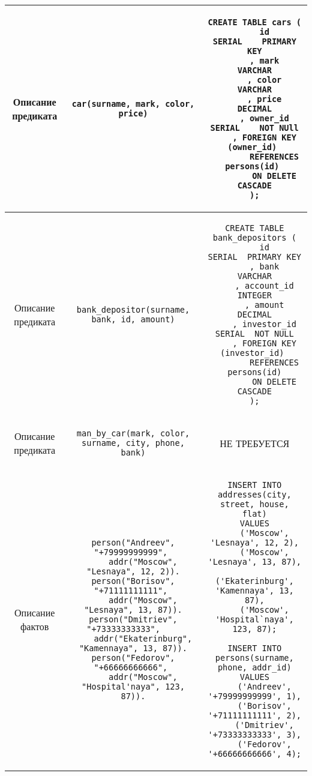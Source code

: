 \begin{landscape}
\begin{longtable}{|c|c|c|}
\hline

Описание предиката&
\begin{lstlisting}
car(surname, mark, color, price)
\end{lstlisting}&
\begin{lstlisting}
CREATE TABLE cars (
    id          SERIAL    PRIMARY KEY
    , mark      VARCHAR
    , color     VARCHAR
    , price     DECIMAL
    , owner_id  SERIAL    NOT NUll
    , FOREIGN KEY (owner_id) 
        REFERENCES persons(id) 
        ON DELETE CASCADE
);
\end{lstlisting} \\

\hline

Описание предиката&
\begin{lstlisting}
bank_depositor(surname, bank, id, amount)
\end{lstlisting}&
\begin{lstlisting}
CREATE TABLE bank_depositors (
    id            SERIAL  PRIMARY KEY
    , bank        VARCHAR
    , account_id  INTEGER
    , amount      DECIMAL
    , investor_id SERIAL  NOT NULL
    , FOREIGN KEY (investor_id) 
        REFERENCES persons(id)
        ON DELETE CASCADE
);
\end{lstlisting} \\

\hline

Описание предиката&
\begin{lstlisting}
man_by_car(mark, color, surname, city, phone, bank)
\end{lstlisting}&
НЕ ТРЕБУЕТСЯ\\

\hline

Описание фактов&
\begin{lstlisting}
person("Andreev", "+79999999999", 
    addr("Moscow", "Lesnaya", 12, 2)).
person("Borisov", "+71111111111", 
    addr("Moscow", "Lesnaya", 13, 87)).
person("Dmitriev", "+73333333333",    
    addr("Ekaterinburg", "Kamennaya", 13, 87)).
person("Fedorov", "+66666666666", 
    addr("Moscow", "Hospital'naya", 123, 87)).
\end{lstlisting}&
\begin{lstlisting}
INSERT INTO addresses(city, street, house, flat)
VALUES
    ('Moscow', 'Lesnaya', 12, 2),
    ('Moscow', 'Lesnaya', 13, 87),
    ('Ekaterinburg', 'Kamennaya', 13, 87),
    ('Moscow', 'Hospital`naya', 123, 87);

INSERT INTO persons(surname, phone, addr_id)
VALUES
    ('Andreev', '+79999999999', 1),
    ('Borisov', '+71111111111', 2),
    ('Dmitriev', '+73333333333', 3),
    ('Fedorov', '+66666666666', 4);
\end{lstlisting} \\


\end{longtable}
\end{landscape}
